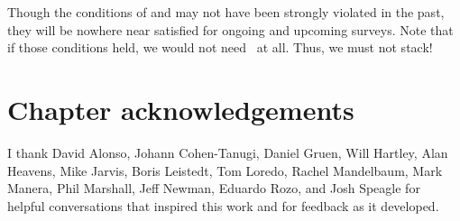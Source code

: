 Though the conditions of  and  may not have been strongly violated in the past, they will be nowhere near satisfied for ongoing and upcoming surveys.
Note that if those conditions held, we would not need \lsst\ at all.
Thus, we must not stack!

\section*{Chapter acknowledgements}

I thank David Alonso, Johann Cohen-Tanugi, Daniel Gruen, Will Hartley, Alan Heavens, Mike Jarvis, Boris Leistedt, Tom Loredo, Rachel Mandelbaum, Mark Manera, Phil Marshall, Jeff Newman, Eduardo Rozo, and Josh Speagle for helpful conversations that inspired this work and for feedback as it developed.
